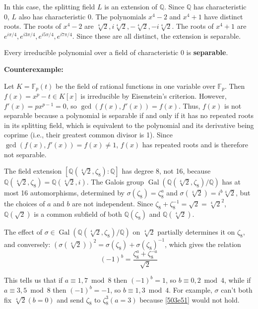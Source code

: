 In this case, the splitting field $L$ is an extension of $\mathbb{Q}$. Since $\mathbb{Q}$ has characteristic 0, $L$ also has characteristic 0. The polynomials $x^4-2$ and $x^4+1$ have distinct roots. The roots of $x^4-2$ are $\sqrt[4]{2}, i\sqrt[4]{2}, -\sqrt[4]{2}, -i\sqrt[4]{2}$. The roots of $x^4+1$ are $e^{i\pi/4}, e^{i3\pi/4}, e^{i5\pi/4}, e^{i7\pi/4}$. Since these are all distinct, the extension is separable.

\begin{theorem}
Every irreducible polynomial over a field of characteristic 0 is \textbf{separable}.
\end{theorem}
\textbf{Counterexample:}

Let $K = \mathbb{F}_p(t)$ be the field of rational functions in one variable over $\mathbb{F}_p$. Then $f(x) = x^p - t \in K[x]$ is irreducible by Eisenstein's criterion. However, $f'(x) = px^{p-1} = 0$, so $\gcd(f(x), f'(x)) = f(x)$. Thus, $f(x)$ is not separable because a polynomial is separable if and only if it has no repeated roots in its splitting field, which is equivalent to the polynomial and its derivative being coprime (i.e., their greatest common divisor is 1). Since $\gcd(f(x), f'(x)) = f(x) \neq 1$, $f(x)$ has repeated roots and is therefore not separable.


The field extension $[\mathbb{Q}(\sqrt[4]{2}, \zeta_8):\mathbb{Q}]$ has degree 8, not 16, because $\mathbb{Q}(\sqrt[4]{2}, \zeta_8) = \mathbb{Q}(\sqrt[4]{2}, i)$. The Galois group $\operatorname{Gal}(\mathbb{Q}(\sqrt[4]{2}, \zeta_8) / \mathbb{Q})$ has at most 16 automorphisms, determined by $\sigma(\zeta_8) = \zeta_8^a$ and $\sigma(\sqrt[4]{2}) = i^b \sqrt[4]{2}$, but the choices of $a$ and $b$ are not independent. Since $\zeta_8 + \zeta_8^{-1} = \sqrt{2} = \sqrt[4]{2}^2$, $\mathbb{Q}(\sqrt{2})$ is a common subfield of both $\mathbb{Q}(\zeta_8)$ and $\mathbb{Q}(\sqrt[4]{2})$.

The effect of $\sigma \in \operatorname{Gal}(\mathbb{Q}(\sqrt[4]{2}, \zeta_8) / \mathbb{Q})$ on $\sqrt[4]{2}$ partially determines it on $\zeta_8$, and conversely: $(\sigma(\sqrt[4]{2}))^2 = \sigma(\zeta_8) + \sigma(\zeta_8)^{-1}$, which gives the relation
\begin{equation}
(-1)^b = \frac{\zeta_8^a + \zeta_8^{-a}}{\sqrt{2}}
\label{503e51}
\end{equation}

This tells us that if $a \equiv 1,7 \bmod 8$ then $(-1)^b=1$, so $b \equiv 0,2 \bmod 4$, while if $a \equiv 3,5 \bmod 8$ then $(-1)^b=-1$, so $b \equiv 1,3 \bmod 4$. For example, $\sigma$ can't both fix $\sqrt[4]{2}(b=0)$ and send $\zeta_8$ to $\zeta_8^3(a=3)$ because \cref{503e51}  would not hold.


